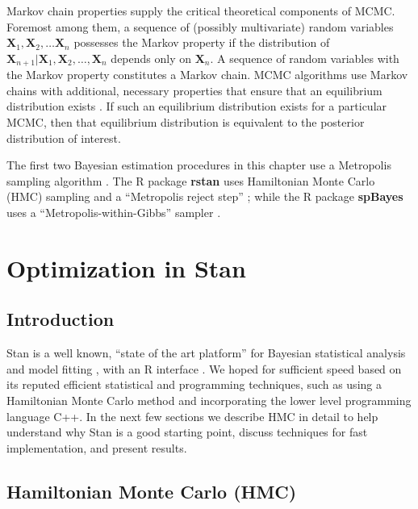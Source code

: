 Markov chain properties supply the critical theoretical components of MCMC. Foremost among them, a sequence of (possibly multivariate) random variables $\pmb{X}_{1}, \pmb{X}_{2}, \hdots \pmb{X}_{n}$ possesses the Markov property if the distribution of $\pmb{X}_{n+1}|\pmb{X}_{1}, \pmb{X}_{2}, \hdots , \pmb{X}_{n}$ depends only on $\pmb{X}_{n}$. A sequence of random variables with the Markov property constitutes a Markov chain. MCMC algorithms use Markov chains with additional, necessary properties that ensure that an equilibrium distribution exists \citep{Brooks2011}. If such an equilibrium distribution exists for a particular MCMC, then that equilibrium distribution is equivalent to the posterior distribution of interest.

The first two Bayesian estimation procedures in this chapter use a Metropolis sampling algorithm \citep{Metropolis1953}. The R package {\bf rstan} uses Hamiltonian Monte Carlo (HMC) sampling and a ``Metropolis reject step'' \citep{rstan}; while the R package {\bf spBayes} uses a ``Metropolis-within-Gibbs'' sampler \citep{Finley2013}. 

\section{Optimization in Stan} \label{stanopt} %

\subsection{Introduction}

Stan is a well known, ``state of the art platform'' for Bayesian statistical analysis and model fitting \citep{stanwebsite}, with an R interface \citep{rstan}. We hoped for sufficient speed based on its reputed efficient statistical and programming techniques, such as using a Hamiltonian Monte Carlo method and incorporating the lower level programming language C++. In the next few sections we describe HMC in detail to help understand why Stan is a good starting point, discuss techniques for fast implementation, and present results.

\subsection{Hamiltonian Monte Carlo (HMC)} 

